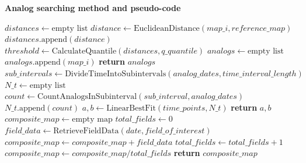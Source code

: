 \documentclass[9pt]{beamer}
\newcommand\Fontvs{\fontsize{4}{6.0}\selectfont}
\begin{document}
\begin{frame}[allowframebreaks]{\textbf{Analog searching method and pseudo-code } \cite{alberti2024}}
\Fontvs
\begin{algorithmic}
    \State $distances \gets \text{empty list}$
        \State $distance \gets \text{EuclideanDistance}(map\_i, reference\_map)$
        \State $distances.\text{append}(distance)$
    \EndFor
    \State $threshold \gets \text{CalculateQuantile}(distances, q\_quantile)$
    \State $analogs \gets \text{empty list}$
            \State $analogs.\text{append}(map\_i)$ 
        \EndIf
    \EndFor
    \State \textbf{return} $analogs$
\EndProcedure
{}
    \State $sub\_intervals \gets \text{DivideTimeIntoSubintervals}(analog\_dates, time\_interval\_length)$
    \State $N\_t \gets \text{empty list}$ 
        \State $count \gets \text{CountAnalogsInSubinterval}(sub\_interval, analog\_dates)$
        \State $N\_t.\text{append}(count)$
    \EndFor
    \State $a, b \gets \text{LinearBestFit}(time\_points, N\_t)$ 
    \State \textbf{return} $a, b$
\EndProcedure
{}
    \State $composite\_map \gets \text{empty map}$
    \State $total\_fields \gets 0$
        \State $field\_data \gets \text{RetrieveFieldData}(date, field\_of\_interest)$
        \State $composite\_map \gets composite\_map + field\_data$ 
        \State $total\_fields \gets total\_fields + 1$
    \EndFor
    \State $composite\_map \gets composite\_map / total\_fields$ 
    \State \textbf{return} $composite\_map$
\EndProcedure
\end{algorithmic}
\end{frame}
\end{document}

